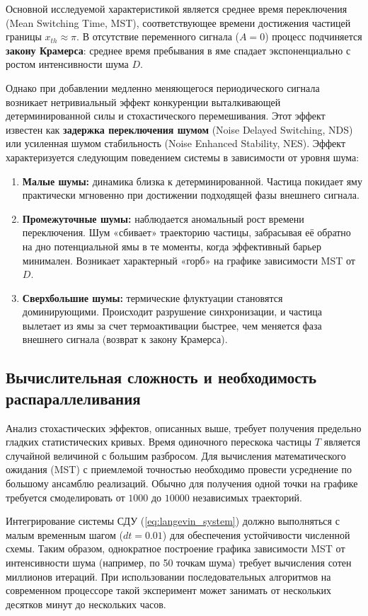 Основной исследуемой характеристикой является среднее время переключения (Mean Switching Time, MST), соответствующее времени достижения частицей границы $x_{th} \approx \pi$. В отсутствие переменного сигнала ($A=0$) процесс подчиняется \textbf{закону Крамерса}: среднее время пребывания в яме спадает экспоненциально с ростом интенсивности шума $D$.

Однако при добавлении медленно меняющегося периодического сигнала возникает нетривиальный эффект конкуренции выталкивающей детерминированной силы и стохастического перемешивания. Этот эффект известен как \textbf{задержка переключения шумом} (Noise Delayed Switching, NDS) или усиленная шумом стабильность (Noise Enhanced Stability, NES). Эффект характеризуется следующим поведением системы в зависимости от уровня шума:
\begin{enumerate}
    \item \textbf{Малые шумы:} динамика близка к детерминированной. Частица покидает яму практически мгновенно при достижении подходящей фазы внешнего сигнала.
    \item \textbf{Промежуточные шумы:} наблюдается аномальный рост времени переключения. Шум «сбивает» траекторию частицы, забрасывая её обратно на дно потенциальной ямы в те моменты, когда эффективный барьер минимален. Возникает характерный «горб» на графике зависимости MST от $D$.
    \item \textbf{Сверхбольшие шумы:} термические флуктуации становятся доминирующими. Происходит разрушение синхронизации, и частица вылетает из ямы за счет термоактивации быстрее, чем меняется фаза внешнего сигнала (возврат к закону Крамерса).
\end{enumerate}

\subsection{Вычислительная сложность и необходимость распараллеливания}
Анализ стохастических эффектов, описанных выше, требует получения предельно гладких статистических кривых. Время одиночного перескока частицы $T$ является случайной величиной с большим разбросом. Для вычисления математического ожидания (MST) с приемлемой точностью необходимо провести усреднение по большому ансамблю реализаций. Обычно для получения одной точки на графике требуется смоделировать от $1 000$ до $10 000$ независимых траекторий.

Интегрирование системы СДУ (\ref{eq:langevin_system}) должно выполняться с малым временным шагом ($dt = 0.01$) для обеспечения устойчивости численной схемы. Таким образом, однократное построение графика зависимости MST от интенсивности шума (например, по 50 точкам шума) требует вычисления сотен миллионов итераций. При использовании последовательных алгоритмов на современном процессоре такой эксперимент может занимать от нескольких десятков минут до нескольких часов.


